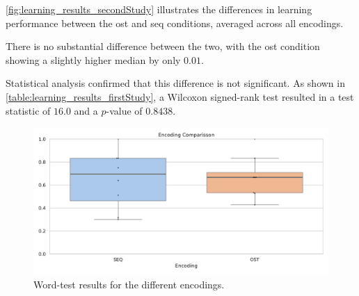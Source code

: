 \autoref{fig:learning_results_secondStudy} illustrates the differences in learning performance between the \gls{ost} and \gls{seq} conditions, averaged across all encodings.

There is no substantial difference between the two, with the \gls{ost} condition showing a slightly higher median by only $0.01$. 

Statistical analysis confirmed that this difference is not significant. As shown in \autoref{table:learning_results_firstStudy}, a Wilcoxon signed-rank test resulted in a test statistic of $16.0$ and a $p$-value of $0.8438$.


\begin{table}[ht]
\caption{Results of the Wilcoxon significance tests during learning with a Cohens D Effect Size.}
\label{table:learning_results_firstStudy}
\end{table}



\begin{figure}
    \centering
    \includegraphics[width=0.5\linewidth]{src/pictures/Study2Data_Experiment/test_averaged-2.pdf}
    \caption{Word-test results for the different encodings.}
    \label{fig:testing_results_secondStudy}
\end{figure}

